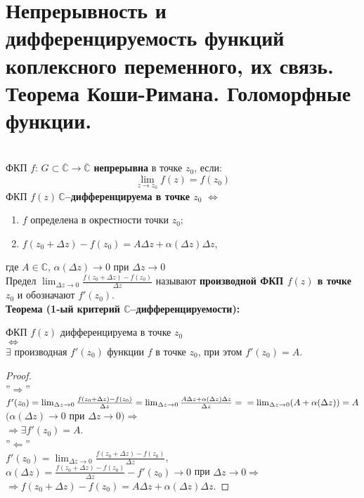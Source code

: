 \newpage 
\section{Непрерывность и дифференцируемость функций коплексного переменного, их связь. Теорема Коши-Римана. Голоморфные функции.}
\ \\
ФКП $f: \, G\subset \overline{\mathbb{C}} \rightarrow \overline{\mathbb{C}}$ \textbf{непрерывна} в точке $z_0$, если:
$$\lim\limits_{z\to z_0}f(z)=f(z_0)$$
ФКП $f(z) \,\mathbf{\mathbb{C}}$\textbf{--дифференцируема в точке $z_0$} $\Leftrightarrow$ 
\begin{enumerate}
    \item $f$ определена в окрестности точки $z_0$;
    \item $f(z_0 + \Delta z) - f(z_0) = A\Delta z + \alpha(\Delta z)\Delta z$,
\end{enumerate}
где $A \in \mathbb{C}$, $\alpha(\Delta z) \rightarrow 0$ при $\Delta z \rightarrow 0$\\[2mm]
Предел $\lim_{\Delta z \rightarrow 0} \frac{f(z_0 + \Delta z) - f(z_0)}{\Delta z}$ называют \textbf{производной ФКП $f(z)$ в точке $z_0$} и обозначают $f'(z_0)$.\\[2mm]
\textbf{Теорема (1-ый критерий $\mathbf{\mathbb{C}}$--дифференцируемости):}
\begin{center}
    ФКП $f(z)$ дифференцируема в точке $z_0$\\
    $\Leftrightarrow$\\
    $\exists$ производная $f'(z_0)$ функции $f$ в точке $z_0$, при этом $f'(z_0) = A$.
\end{center}
\begin{proof}
\ \\
''$\Rightarrow$''\\
$f'(z_0) = \lim_{\Delta z \rightarrow 0} \frac{f(z_0 + \Delta z) - f(z_0)}{\Delta z} = \lim_{\Delta z \rightarrow 0} \frac{A\Delta z + \alpha(\Delta z)\Delta z}{\Delta z} = \\
= \lim_{\Delta z \rightarrow 0} (A + \alpha(\Delta z)) = A$ $(\alpha(\Delta z) \rightarrow 0$ при $\Delta z \rightarrow 0) \Rightarrow$\\
$\Rightarrow \exists f'(z_0) = A$.\\
''$\Leftarrow$''\\
$f'(z_0) = \lim_{\Delta z \rightarrow 0} \frac{f(z_0 + \Delta z) - f(z_0)}{\Delta z}$,\\
$\alpha(\Delta z) = \frac{f(z_0 + \Delta z) - f(z_0)}{\Delta z} - f'(z_0) \rightarrow 0$ при $\Delta z \to 0 \Rightarrow$\\
$\Rightarrow f(z_0 + \Delta z) - f(z_0) = A\Delta z + \alpha(\Delta z)\Delta z$.
\end{proof}
